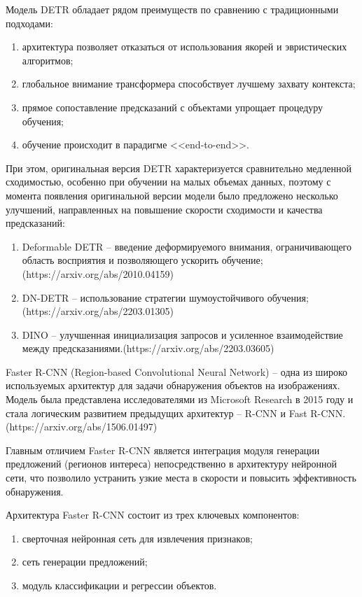 Модель DETR обладает рядом преимуществ по сравнению с традиционными подходами:

\begin{enumerate}
    \item архитектура позволяет отказаться от использования якорей и 
    эвристических алгоритмов;
    \item глобальное внимание трансформера способствует лучшему захвату 
    контекста;
    \item прямое сопоставление предсказаний с объектами упрощает процедуру 
    обучения;
    \item обучение происходит в парадигме <<end-to-end>>.
\end{enumerate}

При этом, оригинальная версия DETR характеризуется сравнительно медленной 
сходимостью, особенно при обучении на малых объемах данных, поэтому с момента 
появления оригинальной версии модели было предложено несколько улучшений, 
направленных на повышение скорости сходимости и качества предсказаний:

\begin{enumerate}
    \item Deformable DETR -- введение деформируемого внимания, ограничивающего 
    область восприятия и позволяющего ускорить обучение;(https://arxiv.org/abs/2010.04159)
    \item DN-DETR -- использование стратегии шумоустойчивого обучения;(https://arxiv.org/abs/2203.01305)
    \item DINO -- улучшенная инициализация запросов и усиленное взаимодействие 
    между предсказаниями.(https://arxiv.org/abs/2203.03605)
\end{enumerate}

Faster R-CNN (Region-based Convolutional Neural Network) -- одна из широко 
используемых архитектур для задачи обнаружения объектов на изображениях. Модель 
была представлена исследователями из Microsoft Research в 2015 году и стала 
логическим развитием предыдущих архитектур -- R-CNN и Fast R-CNN.(https://arxiv.org/abs/1506.01497)

Главным отличием Faster R-CNN является интеграция модуля генерации предложений 
(регионов интереса) непосредственно в архитектуру нейронной сети, что позволило 
устранить узкие места в скорости и повысить эффективность обнаружения.

Архитектура Faster R-CNN состоит из трех ключевых компонентов:

\begin{enumerate}
    \item сверточная нейронная сеть для извлечения признаков;
    \item сеть генерации предложений;
    \item модуль классификации и регрессии объектов.
\end{enumerate}

